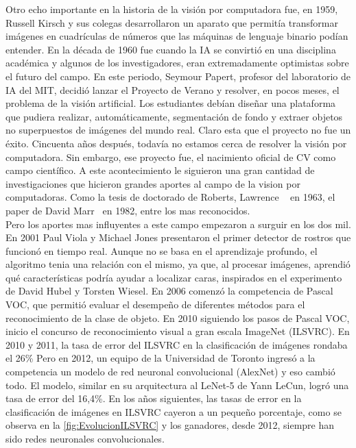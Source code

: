 Otro echo importante en la historia de la visión por computadora fue, en 1959, Russell Kirsch y sus colegas desarrollaron un aparato que permitía transformar imágenes en cuadrículas de números que las máquinas de lenguaje binario podían entender. En la década de 1960 fue cuando la IA se convirtió en una disciplina académica y algunos de los investigadores, eran extremadamente optimistas sobre el futuro del campo. En este periodo, Seymour Papert, profesor del laboratorio de IA del MIT, decidió lanzar el Proyecto de Verano y resolver, en pocos meses, el problema de la visión artificial. Los estudiantes debían diseñar una plataforma que pudiera realizar, automáticamente, segmentación de fondo y extraer objetos no superpuestos de imágenes del mundo real. Claro esta que el proyecto no fue un éxito. Cincuenta años después, todavía no estamos cerca de resolver la visión por computadora. Sin embargo, ese proyecto fue, el nacimiento oficial de CV como campo científico. A este acontecimiento le siguieron una gran cantidad de investigaciones que hicieron grandes aportes al campo de la vision por computadoras. Como la tesis de doctorado de Roberts, Lawrence ~\cite{roberts1963machine} en 1963, el paper de David Marr~\cite{vision_marr} en 1982, entre los mas reconocidos.\\

Pero los aportes mas influyentes a este campo empezaron a surguir en los dos mil.
En 2001 Paul Viola y Michael Jones presentaron el primer detector de rostros que funcionó en tiempo real. Aunque no se basa en el aprendizaje profundo, el algoritmo tenia una relación con el mismo, ya que, al procesar imágenes, aprendió qué características podría ayudar a localizar caras, inspirados en el experimento de David Hubel y Torsten Wiesel. En 2006 comenzó la competencia de Pascal VOC, que permitió evaluar el desempeño de diferentes métodos para el reconocimiento de la clase de objeto. En 2010 siguiendo los pasos de Pascal VOC, inicio el concurso de reconocimiento visual a gran escala ImageNet (ILSVRC). En 2010 y 2011, la tasa de error del ILSVRC en la clasificación de imágenes rondaba el 26\%  Pero en 2012, un equipo de la Universidad de Toronto ingresó a la competencia un modelo de red neuronal convolucional (AlexNet) y eso cambió todo. El modelo, similar en su arquitectura al LeNet-5 de Yann LeCun, logró una tasa de error del 16,4\%. En los años siguientes, las tasas de error en la clasificación de imágenes en ILSVRC cayeron a un pequeño porcentaje, como se observa en la \autoref{fig:EvolucionILSVRC} y los ganadores, desde 2012, siempre han sido redes neuronales convolucionales.

